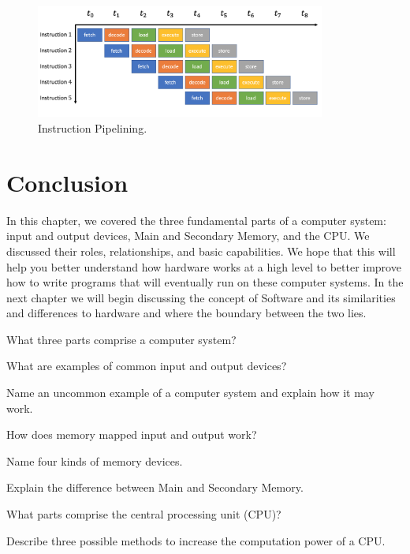 \begin{figure}
	\centering
	\includegraphics[width=0.85\textwidth]{images/pipeline.png}
	\caption{Instruction Pipelining. }
	\label{fig:hardware:pipeline}
\end{figure}


\section {Conclusion}
In this chapter, we covered the three fundamental parts of a computer system:
input and output devices, Main and Secondary Memory, and the CPU. We discussed
their roles, relationships, and basic capabilities. We hope that this will help
you better understand how hardware works at a high level to better improve how
to write programs that will eventually run on these computer systems. In the
next chapter we will begin discussing the concept of Software and its
similarities and differences to hardware and where the boundary between the two
lies.

\exercisesection

\begin{exercise}
What three parts comprise a computer system?
\end{exercise}

\begin{exercise}
What are examples of common input and output devices?
\end{exercise}

\begin{exercise}
Name an uncommon example of a computer system and explain how it may work.
\end{exercise}

\begin{exercise}
How does memory mapped input and output work?
\end{exercise}

\begin{exercise}
Name four kinds of memory devices.
\end{exercise}

\begin{exercise}
Explain the difference between Main and Secondary Memory.
\end{exercise}

\begin{exercise}
What parts comprise the central processing unit (CPU)?
\end{exercise}

\begin{exercise}
Describe three possible methods to increase the computation power of a CPU.
\end{exercise}
